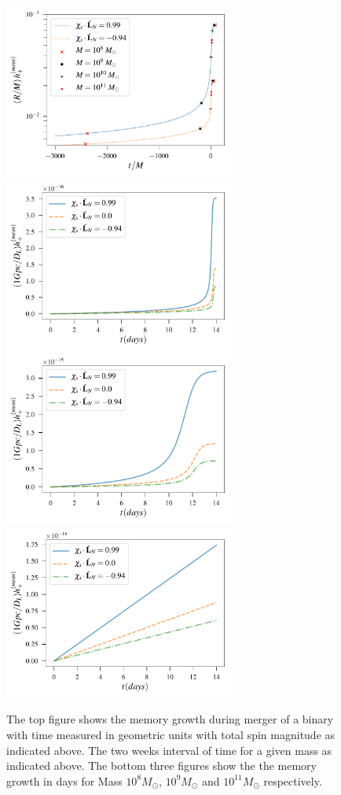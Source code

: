 \documentclass[twocolumn,showpacs,aps,prd,nobibnotes,floatfix]{revtex4-1}
\begin{document}
\begin{figure}
	\includegraphics[width=3.0in]{../plots/PlotfromMathematicaData/MemoryGrowth2weeksGeoUnits.pdf}
	\includegraphics[width=3.0in]{../plots/PlotfromMathematicaData/MemoryGrowth2weeksInDays10pow8MSun.pdf}
	\includegraphics[width=3.0in]{../plots/PlotfromMathematicaData/MemoryGrowth2weeksInDays10pow9MSun.pdf}
	\includegraphics[width=3.0in]{../plots/PlotfromMathematicaData/MemoryGrowth2weeksInDays10pow11MSun.pdf}
	\caption{The top figure shows the memory growth during merger of a binary with time measured in geometric units with total spin magnitude as indicated above. The two weeks interval of time for a given mass as indicated above. The bottom three figures show the the memory growth in days for Mass $10^{8}M_{\odot}$, $10^{9}M_{\odot}$ and $10^{11}M_{\odot}$ respectively.}
	\label{fig:resedualGrowth}
\end{figure} 
\end{document}
